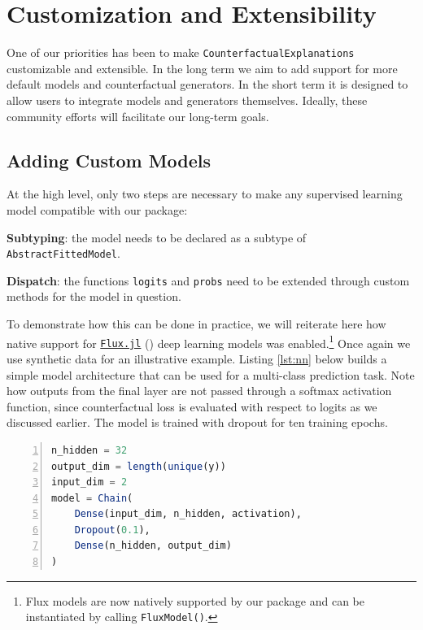 \documentclass[
  letterpaper,
  DIV=11,
  numbers=noendperiod]{scrartcl}
\begin{document}
\hypertarget{sec-custom}{%
\section{Customization and Extensibility}\label{sec-custom}}

One of our priorities has been to make
\texttt{CounterfactualExplanations} customizable and extensible. In the
long term we aim to add support for more default models and
counterfactual generators. In the short term it is designed to allow
users to integrate models and generators themselves. Ideally, these
community efforts will facilitate our long-term goals.

\hypertarget{sec-custom-mod}{%
\subsection{Adding Custom Models}\label{sec-custom-mod}}

At the high level, only two steps are necessary to make any supervised
learning model compatible with our package:

\begin{unnumlist}
\item \textbf{Subtyping}: the model needs to be declared as a subtype of \texttt{AbstractFittedModel}.
\item \textbf{Dispatch}: the functions \texttt{logits} and \texttt{probs} need to be extended through custom methods for the model in question.
\end{unnumlist}

To demonstrate how this can be done in practice, we will reiterate here
how native support for \href{https://fluxml.ai/}{\texttt{Flux.jl}}
(\cite{innes2018flux}) deep learning models was enabled.\footnote{Flux
  models are now natively supported by our package and can be
  instantiated by calling \texttt{FluxModel()}.} Once again we use
synthetic data for an illustrative example. Listing \ref{lst:nn} below
builds a simple model architecture that can be used for a multi-class
prediction task. Note how outputs from the final layer are not passed
through a softmax activation function, since counterfactual loss is
evaluated with respect to logits as we discussed earlier. The model is
trained with dropout for ten training epochs.

\begin{lstlisting}[language=Julia, escapechar=@, numbers=left, label={lst:nn}, caption={}]
n_hidden = 32
output_dim = length(unique(y))
input_dim = 2
model = Chain(
    Dense(input_dim, n_hidden, activation),
    Dropout(0.1),
    Dense(n_hidden, output_dim)
)  
\end{lstlisting}
\end{document}
